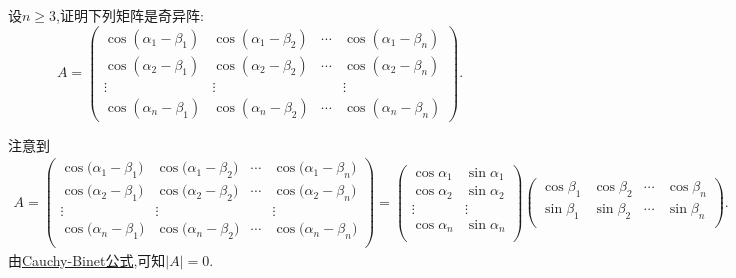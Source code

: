 \documentclass[../../main.tex]{subfiles}%
\begin{document}
\begin{example}
设\(n\geqslant 3\),证明下列矩阵是奇异阵:
\[
A = 
\begin{pmatrix}
\cos(\alpha_1 - \beta_1) & \cos(\alpha_1 - \beta_2) & \cdots & \cos(\alpha_1 - \beta_n)\\
\cos(\alpha_2 - \beta_1) & \cos(\alpha_2 - \beta_2) & \cdots & \cos(\alpha_2 - \beta_n)\\
\vdots & \vdots & & \vdots\\
\cos(\alpha_n - \beta_1) & \cos(\alpha_n - \beta_2) & \cdots & \cos(\alpha_n - \beta_n)
\end{pmatrix}.
\]    
\end{example}
\begin{solution}

注意到
\begin{align*}
A=\left( \begin{matrix}
\cos\mathrm{(}\alpha _1-\beta _1)&		\cos\mathrm{(}\alpha _1-\beta _2)&		\cdots&		\cos\mathrm{(}\alpha _1-\beta _n)\\
\cos\mathrm{(}\alpha _2-\beta_1)&		\cos\mathrm{(}\alpha_2-\beta _2)&		\cdots&	\cos\mathrm{(}\alpha _2-\beta _n)\\
\vdots&		\vdots&		&	\vdots\\
\cos\mathrm{(}\alpha _n-\beta_1)&		\cos\mathrm{(}\alpha_n-\beta _2)&		\cdots&	\cos\mathrm{(}\alpha _n-\beta _n)\\
\end{matrix} \right) 
=\left( \begin{matrix}
\cos \alpha _1&		\sin \alpha_1\\
\cos \alpha _2&		\sin \alpha_2\\
\vdots&		\vdots\\
\cos \alpha _n&		\sin \alpha_n\\
\end{matrix} \right) \left( \begin{matrix}
\cos \beta _1&		\cos \beta _2&		\cdots&		\cos \beta _n\\
\sin \beta _1&		\sin \beta _2&		\cdots&		\sin \beta _n\\
\end{matrix} \right) .
\end{align*}
由\hyperref[theorem:Cauchy-Binet公式]{Cauchy-Binet公式},可知$\left| A \right|=0$.

\end{solution}
\end{document}
